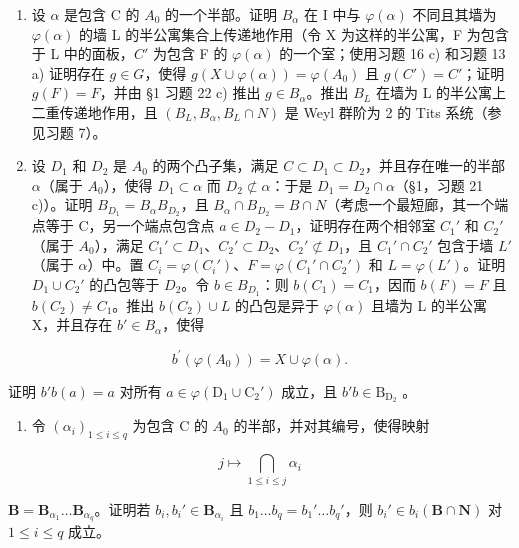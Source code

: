 \begin{enumerate}
\def\labelenumi{\alph{enumi})}
\item
  设 \(\alpha\) 是包含 C 的 \(A_0\) 的一个半部。证明 \(B_{\alpha}\) 在 I 中与 \(\varphi(\alpha)\) 不同且其墙为 \(\varphi(\alpha)\) 的墙 L 的半公寓集合上传递地作用（令 X 为这样的半公寓，F 为包含于 L 中的面板，\(C'\) 为包含 F 的 \(\varphi(\alpha)\) 的一个室；使用习题 16 c) 和习题 13 a) 证明存在 \(g \in G\)，使得 \(g(X \cup \varphi(\alpha)) = \varphi(A_0)\) 且 \(g(C') = C'\)；证明 \(g(F) = F\)，并由 §1 习题 22 c) 推出 \(g \in B_{\alpha}\)。推出 \(B_L\) 在墙为 L 的半公寓上二重传递地作用，且 \((B_L, B_{\alpha}, B_L \cap N)\) 是 Weyl 群阶为 2 的 Tits 系统（参见习题 7）。
\item
  设 \(D_{1}\) 和 \(D_{2}\) 是 \(A_{0}\) 的两个凸子集，满足 \(C \subset D_{1} \subset D_{2}\)，并且存在唯一的半部 \(\alpha\)（属于 \(A_{0}\)），使得 \(D_{1} \subset \alpha\) 而 \(D_{2} \not\subset \alpha\)：于是 \(D_{1} = D_{2} \cap \alpha\)（§1，习题 21 c)）。证明 \(B_{D_{1}} = B_{\alpha}B_{D_{2}}\)，且 \(B_{\alpha} \cap B_{D_{2}} = B \cap N\)（考虑一个最短廊，其一个端点等于 C，另一个端点包含点 \(a \in D_{2} - D_{1}\)，证明存在两个相邻室 \(C_{1}'\) 和 \(C_{2}'\)（属于 \(A_{0}\)），满足 \(C_{1}' \subset D_{1}\)、\(C_{2}' \subset D_{2}\)、\(C_{2}' \not\subset D_{1}\)，且 \(C_{1}' \cap C_{2}'\) 包含于墙 \(L'\)（属于 \(\alpha\)）中。置 \(C_{i} = \varphi(C_{i}')\)、\(F = \varphi(C_{1}' \cap C_{2}')\) 和 \(L = \varphi(L')\)。证明 \(D_{1} \cup C_{2}'\) 的凸包等于 \(D_{2}\)。令 \(b \in B_{D_{1}}\)：则 \(b(C_{1}) = C_{1}\)，因而 \(b(F) = F\) 且 \(b(C_{2}) \neq C_{1}\)。推出 \(b(C_{2}) \cup L\) 的凸包是异于 \(\varphi(\alpha)\) 且墙为 L 的半公寓 X，并且存在 \(b' \in B_{\alpha}\)，使得
\end{enumerate}

\[
b ^ {\prime} (\varphi (A _ {0})) = X \cup \varphi (\alpha).
\]

证明 \(b'b(a) = a\) 对所有 \(a \in \varphi(\mathrm{D}_1 \cup \mathrm{C}_2')\) 成立，且 \(b'b \in \mathrm{B}_{\mathrm{D}_2}\) 。

\begin{enumerate}
\def\labelenumi{\alph{enumi})}
\setcounter{enumi}{2}
\tightlist
\item
  令 \((\alpha_{i})_{1\leqslant i\leqslant q}\) 为包含 C 的 \(A_0\) 的半部，并对其编号，使得映射
\end{enumerate}

\[
j \mapsto \bigcap_ {1 \leqslant i \leqslant j} \alpha_ {i}
\]

  \(\mathbf{B} = \mathbf{B}_{\alpha_1} \ldots \mathbf{B}_{\alpha_q}\)。证明若 \(b_i, b_i' \in \mathbf{B}_{\alpha_i}\) 且 \(b_1 \ldots b_q = b_1' \ldots b_q'\)，则 \(b_i' \in b_i(\mathbf{B} \cap \mathbf{N})\) 对 \(1 \leqslant i \leqslant q\) 成立。


